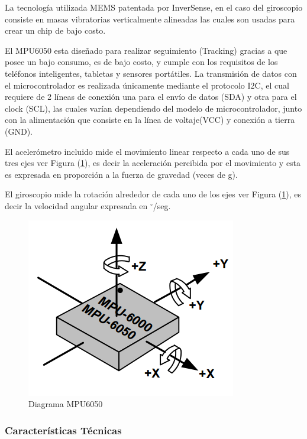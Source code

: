 \documentclass[12pt,a4paper]{article}
\newcommand{\grad}{$^{\circ}$}
\begin{document}
    La tecnología utilizada MEMS patentada por InverSense, en el caso del giroscopio consiste en masas vibratorias verticalmente alineadas las cuales son usadas para crear un chip de bajo costo.
    
 El MPU6050 esta diseñado para realizar seguimiento (Tracking) gracias a que posee un bajo consumo, es de bajo costo, y cumple con los requisitos de los teléfonos inteligentes, tabletas y sensores portátiles.
 La transmisión de datos con el microcontrolador es realizada únicamente mediante el protocolo I2C, el cual requiere de 2 líneas de conexión una para el envío de datos (SDA) y otra para el clock (SCL), las cuales varían dependiendo del modelo de microcontrolador, junto con la alimentación que consiste en la línea de voltaje(VCC) y conexión a tierra (GND).

El acelerómetro incluido mide el movimiento linear respecto a cada uno de sus tres ejes ver Figura (\ref{fig:MPU6050}), es decir la aceleración percibida por el movimiento y esta es expresada en proporción a la fuerza de gravedad (veces de g).

El giroscopio mide la rotación alrededor de cada uno de los ejes ver Figura (\ref{fig:MPU6050}), es decir la velocidad angular expresada en \grad/seg.

\begin{figure}[H]
  \centering
  \includegraphics[scale=0.5]{images/MPU6050}
  \caption{Diagrama MPU6050}
  \label{fig:MPU6050}
\end{figure}

\subsubsection{Características Técnicas}
\end{document}
